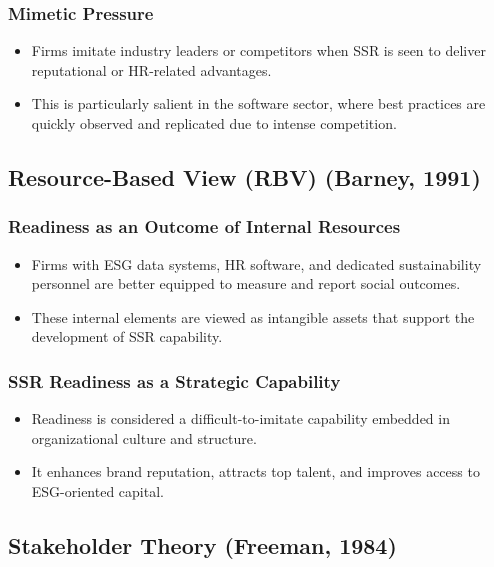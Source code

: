 \subsubsection{Mimetic Pressure}
\begin{itemize}
    \item Firms imitate industry leaders or competitors when SSR is seen to deliver reputational or HR-related advantages. 
    \item This is particularly salient in the software sector, where best practices are quickly observed and replicated due to intense competition.
\end{itemize}

\subsection{Resource-Based View (RBV) (Barney, 1991)}
\subsubsection{Readiness as an Outcome of Internal Resources}
\begin{itemize}
    \item Firms with ESG data systems, HR software, and dedicated sustainability personnel are better equipped to measure and report 
    social outcomes.
    \item These internal elements are viewed as intangible assets that support the development of SSR capability.
\end{itemize}

\subsubsection{SSR Readiness as a Strategic Capability}
\begin{itemize}
    \item Readiness is considered a difficult-to-imitate capability embedded in organizational culture and structure.
    \item It enhances brand reputation, attracts top talent, and improves access to ESG-oriented capital.
\end{itemize}

\subsection{Stakeholder Theory (Freeman, 1984)}
